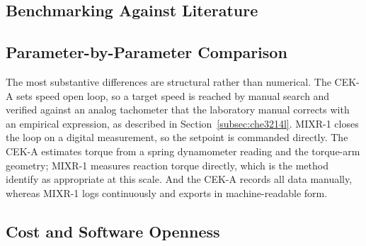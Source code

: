 \subsection{Benchmarking Against Literature}
\label{subsec:val-literature}


\subsection{Parameter-by-Parameter Comparison}
\label{subsec:val-parameters}


The most substantive differences are structural rather than numerical. The CEK-A sets speed open loop, so a target speed is reached by manual search and verified against an analog tachometer that the laboratory manual corrects with an empirical expression, as described in Section~\ref{subsec:che3214l}. MIXR-1 closes the loop on a digital measurement, so the setpoint is commanded directly. The CEK-A estimates torque from a spring dynamometer reading and the torque-arm geometry; MIXR-1 measures reaction torque directly, which is the method \citet{ascanio2004} identify as appropriate at this scale. And the CEK-A records all data manually, whereas MIXR-1 logs continuously and exports in machine-readable form.

\subsection{Cost and Software Openness}
\label{sec:val-cost}


